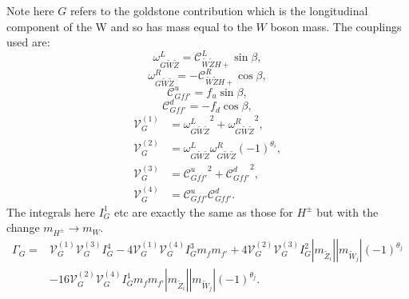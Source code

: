 \documentclass[final,3p,times,pdflatex]{elsarticle}
\begin{document}
Note here $G$ refers to the goldstone contribution which is the longitudinal component of the W and so has mass equal to the $W$ boson mass.
The couplings used are:
\begin{equation}
\omega_{G \tilde{W} \tilde{Z}}^L = \mathcal{C}_{\tilde{W} \tilde{Z} H+}^L \sin\beta,
\end{equation}
\begin{equation}
\omega_{G \tilde{W} \tilde{Z}}^R = -\mathcal{C}_{\tilde{W} \tilde{Z} H+}^R \cos\beta,
\end{equation}
\begin{equation}
\mathcal{C}_{G f f'}^u = f_{u}\sin\beta,
\end{equation}
\begin{equation}
\mathcal{C}_{G f f'}^d = -f_{d} \cos\beta,
\end{equation}
\begin{align}
\mathcal{V}_{G}^{(1)} &= {\omega_{G \tilde{W} \tilde{Z}}^L}^2 + {\omega_{G \tilde{W} \tilde{Z}}^R}^2, \\
\mathcal{V}_{G}^{(2)} &= \omega_{G \tilde{W} \tilde{Z}}^L  \omega_{G \tilde{W} \tilde{Z}}^R  (-1)^{\theta_i}, \\
\mathcal{V}_{G}^{(3)} &= {\mathcal{C}_{G f f'}^u}^2 + {\mathcal{C}_{G f f'}^d}^2, \\
\mathcal{V}_{G}^{(4)} &= {\mathcal{C}_{G f f'}^u}  \mathcal{C}_{G f f'}^d.
\end{align}
The integrals here $I_{G}^{1}$ etc are exactly the same as those for $H^{\pm}$ but with the change $m_{H^{\pm}} \rightarrow m_{W}$.
\begin{equation}
\begin{aligned}
\Gamma_{G} = & \mathcal{V}_{G}^{(1)} \mathcal{V}_{G}^{(3)} I_{G}^{4} - 4 \mathcal{V}_{G}^{(1)} \mathcal{V}_{G}^{(4)} I_{G}^3 m_{f} m_{f'} + 4 \mathcal{V}_{G}^{(2)} \mathcal{V}_{G}^{(3)} I_{G}^2 |m_{\tilde{Z}_i}||m_{\tilde{W}_j}|(-1)^{\theta_j} \\ & - 16 \mathcal{V}_{G}^{(2)} \mathcal{V}_{G}^{(4)} I_{G}^{1} m_{f} m_{f'} |m_{\tilde{Z}_i}||m_{\tilde{W}_j}|(-1)^{\theta_j}.
\end{aligned}
\end{equation}
\end{document}

